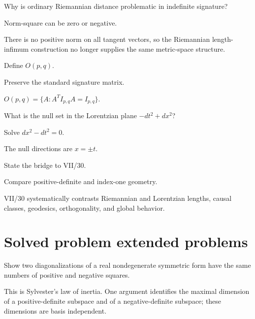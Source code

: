 \begin{exercise}\label{exr:vii29-21}
Why is ordinary Riemannian distance problematic in indefinite signature?
\end{exercise}
\begin{hint}
Norm-square can be zero or negative.
\end{hint}
\begin{solution}
There is no positive norm on all tangent vectors, so the Riemannian length-infimum construction no longer supplies the same metric-space structure.
\end{solution}

\begin{exercise}\label{exr:vii29-22}
Define \(O(p,q)\).
\end{exercise}
\begin{hint}
Preserve the standard signature matrix.
\end{hint}
\begin{solution}
\(O(p,q)=\{A:A^TI_{p,q}A=I_{p,q}\}\).
\end{solution}

\begin{exercise}\label{exr:vii29-23}
What is the null set in the Lorentzian plane \(-dt^2+dx^2\)?
\end{exercise}
\begin{hint}
Solve \(dx^2-dt^2=0\).
\end{hint}
\begin{solution}
The null directions are \(x=\pm t\).
\end{solution}

\begin{exercise}\label{exr:vii29-24}
State the bridge to VII/30.
\end{exercise}
\begin{hint}
Compare positive-definite and index-one geometry.
\end{hint}
\begin{solution}
VII/30 systematically contrasts Riemannian and Lorentzian lengths, causal classes, geodesics, orthogonality, and global behavior.
\end{solution}

\section{Solved problem extended problems}
\begin{problem}\label{prob:vii29-01}
Show two diagonalizations of a real nondegenerate symmetric form have the same numbers of positive and negative squares.
\end{problem}
\begin{solution}
This is Sylvester's law of inertia. One argument identifies the maximal dimension of a positive-definite subspace and of a negative-definite subspace; these dimensions are basis independent.
\end{solution}


